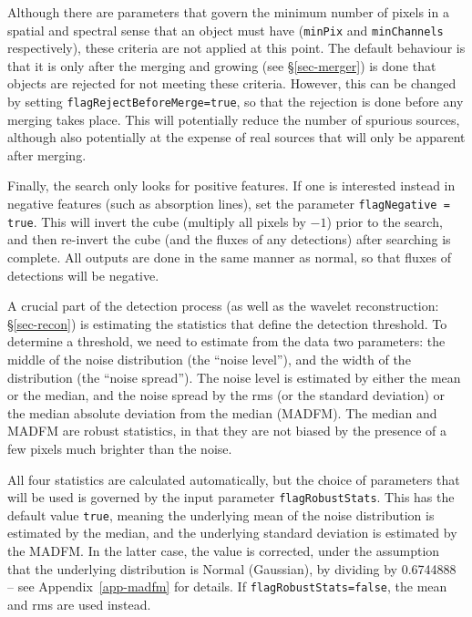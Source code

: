 Although there are parameters that govern the minimum number of pixels
in a spatial and spectral sense that an object must have
(\texttt{minPix} and \texttt{minChannels} respectively), these
criteria are not applied at this point. The default behaviour is that
it is only after the merging and growing (see \S\ref{sec-merger}) is
done that objects are rejected for not meeting these
criteria. However, this can be changed by setting
\texttt{flagRejectBeforeMerge=true}, so that the rejection is done
before any merging takes place. This will potentially reduce the
number of spurious sources, although also potentially at the expense
of real sources that will only be apparent after merging.

Finally, the search only looks for positive features. If one is
interested instead in negative features (such as absorption lines),
set the parameter \texttt{flagNegative = true}. This will invert the
cube (\ie multiply all pixels by $-1$) prior to the search, and then
re-invert the cube (and the fluxes of any detections) after searching
is complete. All outputs are done in the same manner as normal, so
that fluxes of detections will be negative.

\label{sec-stats}

A crucial part of the detection process (as well as the wavelet
reconstruction: \S\ref{sec-recon}) is estimating the statistics that
define the detection threshold. To determine a threshold, we need to
estimate from the data two parameters: the middle of the noise
distribution (the ``noise level''), and the width of the distribution
(the ``noise spread''). The noise level is estimated by either the
mean or the median, and the noise spread by the rms (or the standard
deviation) or the median absolute deviation from the median
(MADFM). The median and MADFM are robust statistics, in that they are
not biased by the presence of a few pixels much brighter than the
noise.

All four statistics are calculated automatically, but the choice of
parameters that will be used is governed by the input parameter
\texttt{flagRobustStats}. This has the default value \texttt{true},
meaning the underlying mean of the noise distribution is estimated by
the median, and the underlying standard deviation is estimated by the
MADFM. In the latter case, the value is corrected, under the
assumption that the underlying distribution is Normal (Gaussian), by
dividing by 0.6744888 -- see Appendix~\ref{app-madfm} for details. If
\texttt{flagRobustStats=false}, the mean and rms are used instead.

